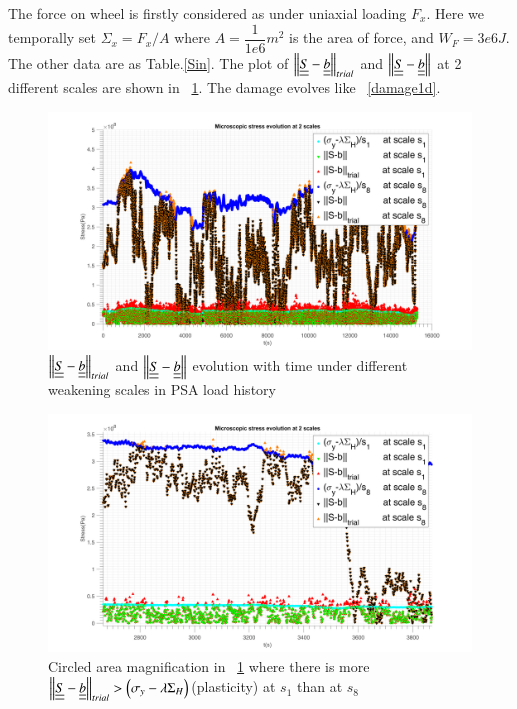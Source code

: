 \documentclass[3p,times,number,review]{elsarticle}
\newcommand{\figref}[1]{\figurename~\ref{#1}}
\begin{document}
The force on wheel is firstly considered as under uniaxial loading $F_x$. Here we temporally set $\Sigma_x=F_x/A$ where $A=\dfrac{1}{1e6} m^2$ is the area of force, and $W_F=3e6 J$. The other data are as Table.\ref{Sin}. The plot of $\left\|  \uline{\uline{S}}-\uline{\uline{b}}\right\|_{trial}$ and $\left\|  \uline{\uline{S}}-\uline{\uline{b}}\right\|$ at 2 different scales are shown in \figref{trialreal}. The damage evolves like \figref{damage1d}. 

\begin{figure}[!h]
	\centering
	\includegraphics[width=\textwidth]{figures//trialreal1d1.png} 
	\caption{$\left\|  \uline{\uline{S}}-\uline{\uline{b}}\right\|_{trial}$ and $\left\|  \uline{\uline{S}}-\uline{\uline{b}}\right\|$ evolution with time under different weakening scales in PSA load history}
	\label{trialreal}
\end{figure}
\begin{figure}[!h]
	\centering
	\includegraphics[width=\textwidth]{figures//trialreal1d2.png} 
	\caption{Circled area magnification in \figref{trialreal} where there is more $\left\|  \uline{\uline{S}}-\uline{\uline{b}}\right\|_{trial}>\left(\sigma_y-\lambda \Sigma_H\right)$(plasticity)  at $s_1$ than at $s_8$}
	\label{trialreal1d2}
\end{figure}
\end{document}
